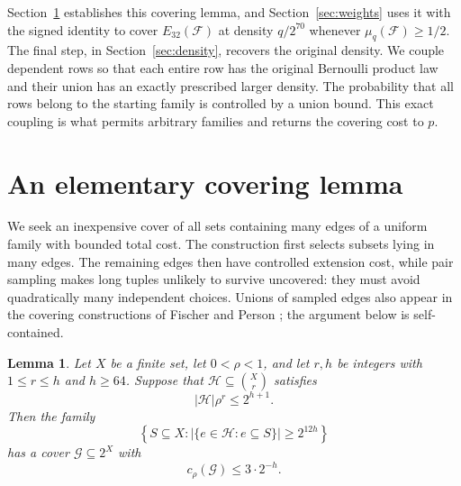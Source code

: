 \documentclass[11pt,letterpaper]{article}
\newtheorem{lemma}[theorem]{Lemma}
\theoremstyle{definition}
\theoremstyle{remark}
\numberwithin{equation}{section}
\begin{document}
Section~\ref{sec:covering} establishes this covering lemma, and
Section~\ref{sec:weights} uses it with the signed identity to cover
$E_{32}(\mathcal F)$ at density $q/2^{70}$ whenever
$\mu_q(\mathcal F)\ge1/2$. The final step, in
Section~\ref{sec:density}, recovers the original density. We couple
dependent rows so that each entire row has the original Bernoulli product
law and their union has an exactly prescribed larger density. The
probability that all rows belong to the starting family is controlled by
a union bound. This exact coupling is what permits arbitrary families
and returns the covering cost to $p$.

\section{An elementary covering lemma}
\label{sec:covering}

We seek an inexpensive cover of all sets containing many edges of a
uniform family with bounded total cost. The construction first selects
subsets lying in many edges. The remaining edges then have controlled
extension cost, while pair sampling makes long tuples unlikely to survive
uncovered: they must avoid quadratically many independent choices.
Unions of sampled edges also
appear in the covering constructions of Fischer and Person
\cite[Sections~1.1 and~2]{FischerPerson25}; the argument below is self-contained.

\begin{lemma}\label{lem:covering}
Let \(X\) be a finite set, let \(0<\rho<1\), and let \(r,h\) be integers
with \(1\le r\le h\) and \(h\ge64\). Suppose that
\(\mathcal H\subseteq\binom{X}{r}\) satisfies
\[
|\mathcal H|\rho^r\le2^{h+1}.
\]
Then the family
\[
\left\{S\subseteq X:
  |\{e\in\mathcal H:e\subseteq S\}|\ge2^{12h}\right\}
\]
has a cover \(\mathcal G\subseteq2^X\) with
\[
c_\rho(\mathcal G)\le3\cdot2^{-h}.
\]
\end{lemma}
\end{document}
